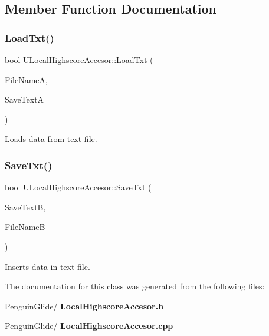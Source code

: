 \subsection{Member Function Documentation}
\mbox{\label{class_u_local_highscore_accesor_a0d0d5df72ec4f612cca71f2e26874138}} 
\subsubsection{LoadTxt()}
{\footnotesize\ttfamily bool U\+Local\+Highscore\+Accesor\+::\+Load\+Txt (\begin{DoxyParamCaption}\item[{F\+String}]{File\+NameA,  }\item[{T\+Array$<$ F\+String $>$ \&}]{Save\+TextA }\end{DoxyParamCaption})\hspace{0.3cm}{\ttfamily [static]}}



Loads data from text file. 

\mbox{\label{class_u_local_highscore_accesor_a5bd958582af0dddc232e284e2df552c7}} 
\subsubsection{SaveTxt()}
{\footnotesize\ttfamily bool U\+Local\+Highscore\+Accesor\+::\+Save\+Txt (\begin{DoxyParamCaption}\item[{T\+Array$<$ F\+String $>$}]{Save\+TextB,  }\item[{F\+String}]{File\+NameB }\end{DoxyParamCaption})\hspace{0.3cm}{\ttfamily [static]}}



Inserts data in text file. 



The documentation for this class was generated from the following files\+:\begin{DoxyCompactItemize}
\item 
Penguin\+Glide/\textbf{ Local\+Highscore\+Accesor.\+h}\item 
Penguin\+Glide/\textbf{ Local\+Highscore\+Accesor.\+cpp}\end{DoxyCompactItemize}
